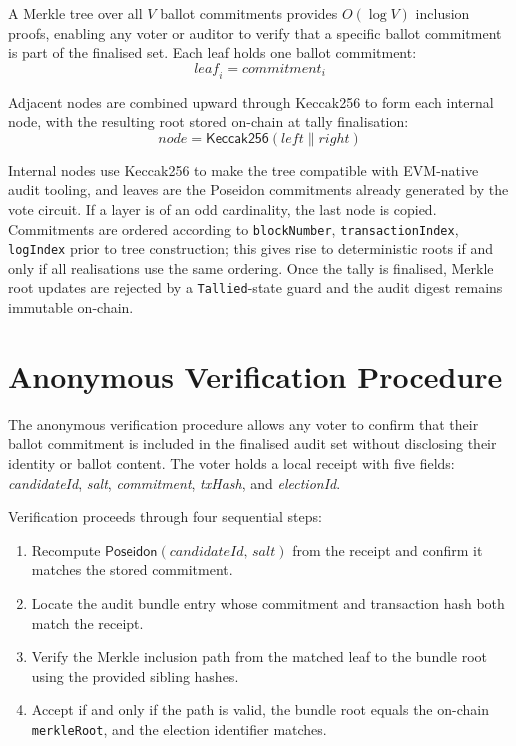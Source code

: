 A Merkle tree over all $V$ ballot commitments provides $O(\log V)$ inclusion proofs, enabling any voter or auditor to verify that a specific ballot commitment is part of the finalised set. Each leaf holds one ballot commitment:
\begin{equation}
\mathit{leaf}_i = \mathit{commitment}_i
\end{equation}

Adjacent nodes are combined upward through Keccak256 to form each internal node, with the resulting root stored on-chain at tally finalisation:
\begin{equation}
\mathit{node} = \mathsf{Keccak256}(\mathit{left} \parallel \mathit{right})
\end{equation}

Internal nodes use Keccak256 to make the tree compatible with EVM-native audit tooling, and leaves are the Poseidon commitments already generated by the vote circuit. If a layer is of an odd cardinality, the last node is copied. Commitments are ordered according to \texttt{blockNumber}, \texttt{transactionIndex}, \texttt{logIndex} prior to tree construction; this gives rise to deterministic roots if and only if all realisations use the same ordering. Once the tally is finalised, Merkle root updates are rejected by a \texttt{Tallied}-state guard and the audit digest remains immutable on-chain.

\section{Anonymous Verification Procedure}

The anonymous verification procedure allows any voter to confirm that their ballot commitment is included in the finalised audit set without disclosing their identity or ballot content. The voter holds a local receipt with five fields: \textit{candidateId}, \textit{salt}, \textit{commitment}, \textit{txHash}, and \textit{electionId}.

Verification proceeds through four sequential steps:
\begin{enumerate}
    \item Recompute $\mathsf{Poseidon}(\mathit{candidateId},\, \mathit{salt})$ from the receipt and confirm it matches the stored commitment.
    \item Locate the audit bundle entry whose commitment and transaction hash both match the receipt.
    \item Verify the Merkle inclusion path from the matched leaf to the bundle root using the provided sibling hashes.
    \item Accept if and only if the path is valid, the bundle root equals the on-chain \texttt{merkleRoot}, and the election identifier matches.
\end{enumerate}

